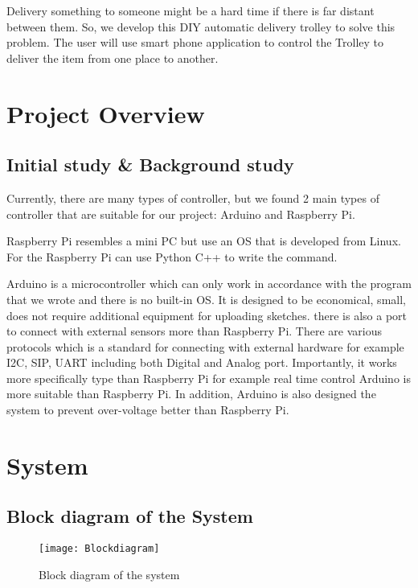 \documentclass[12pt]{article}
\begin{document}
Delivery something to someone might be a hard time if there is far distant between them. So, we develop this DIY automatic delivery trolley to solve this problem. The user will use smart phone application to control the Trolley to deliver the item from one place to another.

\section{Project Overview} \label{sec:project over}

\subsection{Initial study \& Background study} \label{subsec:initial study}

Currently, there are many types of controller, but we found 2 main types of controller that are suitable for our project: Arduino and Raspberry Pi. \par
Raspberry Pi resembles a mini PC but use an OS that is developed from Linux. For the Raspberry Pi can use Python C++ to write the command. \par
Arduino is a microcontroller which can only work in accordance with the program that we wrote and there is no built-in OS. It is designed to be economical, small, does not require additional equipment for uploading sketches. there is also a port to connect with external sensors more than Raspberry Pi. There are various protocols which is a standard for connecting with external hardware for example I2C, SIP, UART including both Digital and Analog port. Importantly, it works more specifically type than Raspberry Pi for example real time control Arduino is more suitable than Raspberry Pi. In addition, Arduino is also designed the system to prevent over-voltage better than Raspberry Pi.

\section{System} \label{sec:system}

\subsection{Block diagram of the System} \label{subsec:block diagram}

\begin{figure}[H]
	\centering
	\texttt{[image: Blockdiagram]}
	\caption{Block diagram of the system} \label{fig:block}	
\end{figure}
\end{document}
